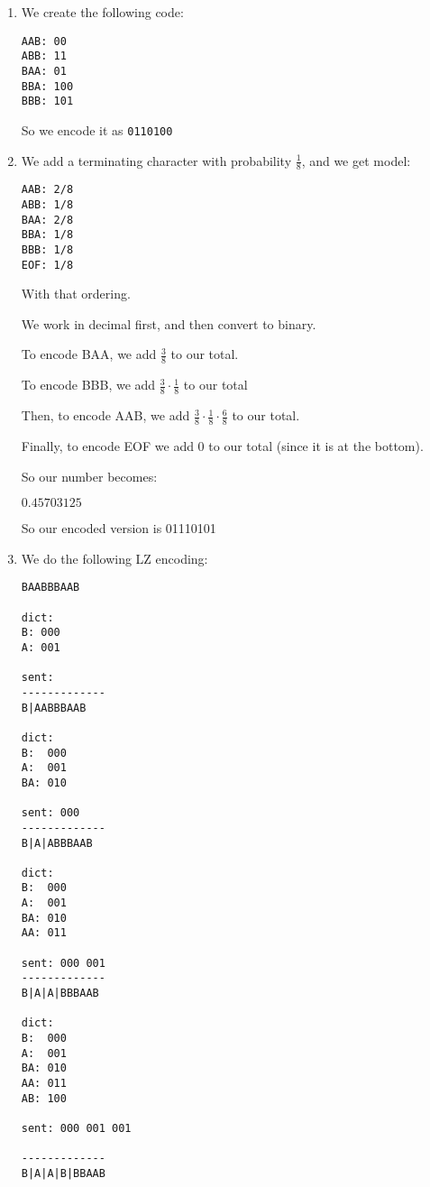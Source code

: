 \begin{enumerate}
            \begin{enumerate}
                \item

                  We create the following code:
\begin{verbatim}
AAB: 00
ABB: 11
BAA: 01
BBA: 100
BBB: 101
\end{verbatim}

So we encode it as \texttt{0110100}

\item

  We add a terminating character with probability $\frac{1}{8}$, and we get model:

\begin{verbatim}
AAB: 2/8
ABB: 1/8
BAA: 2/8
BBA: 1/8
BBB: 1/8
EOF: 1/8
\end{verbatim}

  With that ordering.

  We work in decimal first, and then convert to binary.

  To encode BAA, we add $\frac{3}{8}$ to our total.

  To encode BBB, we add $\frac{3}{8} \cdot \frac{1}{8}$ to our total

  Then, to encode AAB, we add $\frac{3}{8} \cdot \frac{1}{8} \cdot \frac{6}{8}$ to our total.

  Finally, to encode EOF we add 0 to our total (since it is at the bottom).

  So our number becomes:

  $0.45703125$

  So our encoded version is 01110101

  \item
    We do the following LZ encoding:

\begin{verbatim}
BAABBBAAB

dict:
B: 000
A: 001

sent:
-------------
B|AABBBAAB

dict:
B:  000
A:  001
BA: 010

sent: 000
-------------
B|A|ABBBAAB

dict:
B:  000
A:  001
BA: 010
AA: 011

sent: 000 001
-------------
B|A|A|BBBAAB

dict:
B:  000
A:  001
BA: 010
AA: 011
AB: 100

sent: 000 001 001

-------------
B|A|A|B|BBAAB


\end{verbatim}
\end{enumerate}
\end{enumerate}
